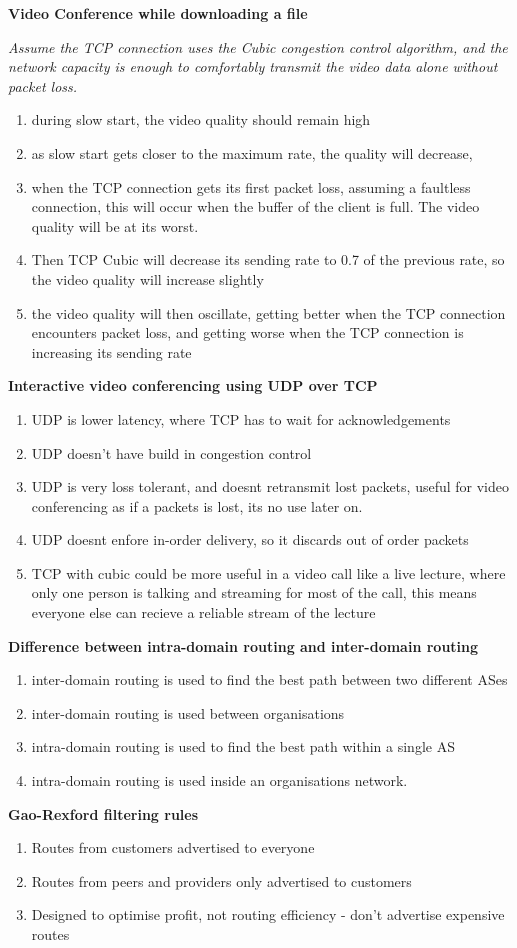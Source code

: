 \documentclass{article}
\begin{document}
\clearpage

\textbf{Video Conference while downloading a file}

\textit{Assume the TCP connection uses the Cubic congestion control algorithm, and the network capacity is enough to comfortably transmit the video data alone without packet loss.}

\begin{enumerate}
    \item during slow start, the video quality should remain high
    \item as slow start gets closer to the maximum rate, the quality will decrease,
    \item when the TCP connection gets its first packet loss, assuming a faultless connection, this will occur when the buffer of the client is full. The video quality will be at its worst.
    \item Then TCP Cubic will decrease its sending rate to 0.7 of the previous rate, so the video
    quality will increase slightly
    \item the video quality will then oscillate, getting better when the TCP connection encounters packet loss, and getting worse when the TCP connection is increasing its sending rate
\end{enumerate}


\textbf{Interactive video conferencing using UDP over TCP}

\begin{enumerate}
    \item UDP is lower latency, where TCP has to wait for acknowledgements
    \item UDP doesn't have build in congestion control
    \item UDP is very loss tolerant, and doesnt retransmit lost packets, useful for video conferencing as if a packets is lost, its no use later on.
    \item UDP doesnt enfore in-order delivery, so it discards out of order packets
    \item TCP with cubic could be more useful in a video call like a live lecture, where only one person is talking and streaming for most of the call, this means everyone else can recieve a reliable stream of the lecture
\end{enumerate}

\textbf{Difference between intra-domain routing and inter-domain routing}

\begin{enumerate}
    \item inter-domain routing is used to find the best path between two different ASes
    \item inter-domain routing is used between organisations
    \item intra-domain routing is used to find the best path within a single AS
    \item intra-domain routing is used inside an organisations network.
\end{enumerate}

\textbf{Gao-Rexford filtering rules}

\begin{enumerate}
    \item Routes from customers advertised to everyone
    \item Routes from peers and providers only advertised to customers
    \item Designed to optimise profit, not routing efficiency {-} don't advertise expensive routes
\end{enumerate}
\end{document}
